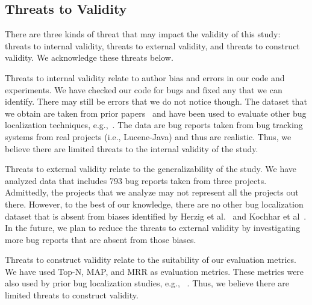 \subsection{Threats to Validity}

There are three kinds of threat that may impact the validity of this study: threats to internal validity, threats to external validity, and threats to construct validity. We acknowledge these threats below.

Threats to internal validity relate to author bias and errors in our code and experiments. We have checked our code for bugs and fixed any that we can identify. There may still be errors that we do not notice though. The dataset that we obtain are taken from prior papers~\cite{zhou2012should,KochharTL14} and have been used to evaluate other bug localization techniques, e.g.,~\cite{zhou2012should,SahaLKP14,huo2016learning}. The data are bug reports taken from bug tracking systems from real projects (i.e., Lucene-Java) and thus are realistic. Thus, we believe there are limited threats to the internal validity of the study. 

Threats to external validity relate to the generalizability of the study. We have analyzed data that includes 793 bug reports taken from three projects. Admittedly, the projects that we analyze may not represent all the projects out there. However, to the best of our knowledge, there are no other bug localization dataset that is absent from biases identified by Herzig et al.~\cite{HerzigJZ13} and Kochhar et al~\cite{KochharTL14}. In the future, we plan to reduce the threats to external validity by investigating more bug reports that are absent from those biases. %

Threats to construct validity relate to the suitability of our evaluation metrics. We have used Top-N, MAP, and MRR as evaluation metrics. These metrics were also used by prior bug localization studies, e.g.,  ~\cite{zhou2012should,SahaLKP14,huo2016learning}. Thus, we believe there are limited threats to construct validity. 